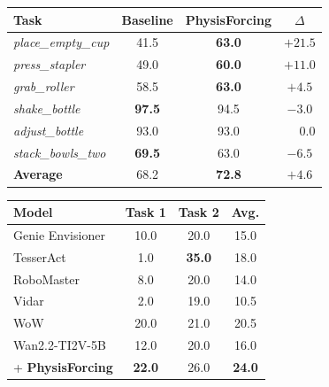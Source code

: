 \documentclass{llmxive}
\providecommand{\arraystretch}{1.15}
\begin{document}
\begin{figure}[t]
\centering
\footnotesize
\setlength{\tabcolsep}{4pt}
\renewcommand{\arraystretch}{1.1}
\begin{minipage}[t]{0.49\linewidth}
\vspace{0pt}
\centering
\begin{minipage}[t][2.6\baselineskip][t]{\linewidth}
\label{tab:robotwin_results}
\end{minipage}
\begin{tabular}{lccc}
\toprule
\textbf{Task} & \textbf{Baseline} & \textbf{PhysisForcing} & $\Delta$ \\
\midrule
\textit{place\_empty\_cup}  & 41.5 & \textbf{63.0} & $+21.5$ \\
\textit{press\_stapler}     & 49.0 & \textbf{60.0} & $+11.0$ \\
\textit{grab\_roller}       & 58.5 & \textbf{63.0} & $+4.5$ \\
\textit{shake\_bottle}      & \textbf{97.5} & 94.5 & $-3.0$ \\
\textit{adjust\_bottle}     & 93.0 & 93.0 & $\phantom{+}0.0$ \\
\textit{stack\_bowls\_two}  & \textbf{69.5} & 63.0 & $-6.5$ \\
\midrule
\textbf{Average}            & 68.2 & \textbf{72.8} & $+4.6$ \\
\bottomrule
\end{tabular}
\end{minipage}
\hfill
\begin{minipage}[t]{0.49\linewidth}
\vspace{0pt}
\centering
\begin{minipage}[t][2.6\baselineskip][t]{\linewidth}
\label{tab:worldarena}
\end{minipage}
\begin{tabular}{lccc}
\toprule
\textbf{Model} & \textbf{Task 1} & \textbf{Task 2} & \textbf{Avg.} \\
\midrule
Genie Envisioner~\cite{liao2025genie} & 10.0 & 20.0 & 15.0 \\
TesserAct~\cite{zhen2025tesseract} & \phantom{0}1.0 & \textbf{35.0} & 18.0 \\
RoboMaster & \phantom{0}8.0 & 20.0 & 14.0 \\
Vidar~\cite{feng2025vidar} & \phantom{0}2.0 & 19.0 & 10.5 \\
WoW~\cite{chi2025wow} & 20.0 & 21.0 & 20.5 \\
\midrule
Wan2.2-TI2V-5B & 12.0 & 20.0 & 16.0 \\
\quad + \textbf{PhysisForcing} & \textbf{22.0} & 26.0 & \textbf{24.0} \\
\bottomrule
\end{tabular}
\end{minipage}
\end{figure}
\end{document}
